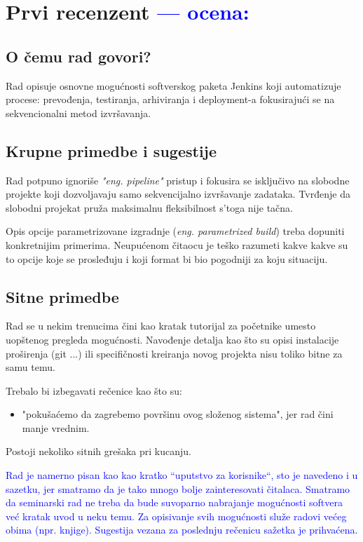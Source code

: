 \documentclass[a4paper]{report}
\newcommand{\odgovor}[1]{\textcolor{blue}{#1}}
\begin{document}
\chapter{Prvi recenzent \odgovor{--- ocena:} }

\section{O čemu rad govori?}
Rad opisuje osnovne mogućnosti softverskog paketa Jenkins koji automatizuje
procese: prevođenja, testiranja, arhiviranja i deployment-a fokusirajući se na 
sekvencionalni metod izvršavanja.

\section{Krupne primedbe i sugestije}

Rad potpuno ignoriše \textit{"eng. pipeline"} pristup i fokusira se isključivo na slobodne
projekte koji dozvoljavaju samo sekvencijalno izvršavanje zadataka. Tvrđenje da slobodni
projekat pruža maksimalnu fleksibilnost s'toga nije tačna.

Opis opcije parametrizovane izgradnje (\textit{eng. parametrized build}) treba
dopuniti konkretnijim primerima. Neupućenom čitaocu je teško razumeti kakve kakve su
to opcije koje se prosleđuju i koji format bi bio pogodniji za koju situaciju.

\section{Sitne primedbe}
Rad se u nekim trenucima čini kao kratak tutorijal za početnike umesto uopštenog
pregleda mogućnosti. Navođenje detalja kao što su opisi instalacije proširenja
(git ...) ili specifičnosti kreiranja novog projekta nisu toliko bitne za 
samu temu.

Trebalo bi izbegavati rečenice kao što su:
\begin{itemize}
  \item "pokušaćemo da zagrebemo površinu ovog složenog sistema", jer rad čini manje vrednim.
\end{itemize}
Postoji nekoliko sitnih grešaka pri kucanju.


\odgovor{Rad je namerno pisan kao kao kratko ``uputstvo za korisnike``, sto je navedeno i u sazetku, jer smatramo da je tako mnogo bolje zainteresovati čitalaca. Smatramo da seminarski rad ne treba da bude suvoparno nabrajanje mogućnosti softvera već kratak uvod u neku temu. Za opisivanje svih mogućnosti služe radovi većeg obima (npr. knjige). Sugestija vezana za poslednju rečenicu sažetka je prihvaćena.}
\end{document}
